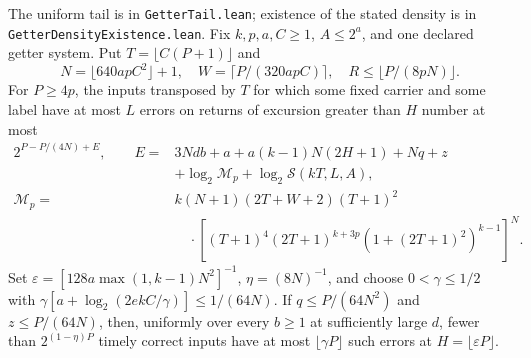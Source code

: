 \begin{theorem}\label{thm:getter-tail}
The uniform tail is  in
\texttt{GetterTail.lean}; existence of the stated density is
 in \texttt{GetterDensityExistence.lean}.
Fix $k,p,a,C\ge1$, $A\le2^a$, and one declared getter system.
Put $T=\lfloor C(P+1)\rfloor$ and
\[
 N=\lfloor640apC^2\rfloor+1,\quad W=\lceil P/(320apC)\rceil,
 \quad R\le\lfloor P/(8pN)\rfloor.
\]
For $P\ge4p$, the inputs transposed by $T$ for which some fixed carrier
and some label have at most $L$ errors on returns of excursion greater
than $H$ number at most
\begin{align*}
 2^{P-P/(4N)+E},\qquad
 E={}&3Ndb+a+a(k-1)N(2H+1)+Nq+z\\
     &+\log_2\mathcal M_p+\log_2\mathcal S(kT,L,A),\\
 \mathcal M_p={}&k(N+1)(2T+W+2)(T+1)^2\\
 &\quad\cdot[(T+1)^4(2T+1)^{k+3p}
                  (1+(2T+1)^2)^{k-1}]^N.
\end{align*}
Set $\varepsilon=[128a\max(1,k-1)N^2]^{-1}$, $\eta=(8N)^{-1}$,
and choose $0<\gamma\le1/2$ with
$\gamma[a+\log_2(2ekC/\gamma)]\le1/(64N)$.
If $q\le P/(64N^2)$ and $z\le P/(64N)$, then, uniformly over every
$b\ge1$ at sufficiently large $d$, fewer than $2^{(1-\eta)P}$ timely
correct inputs have at most $\lfloor\gamma P\rfloor$ such errors at
$H=\lfloor\varepsilon P\rfloor$.
\end{theorem}
